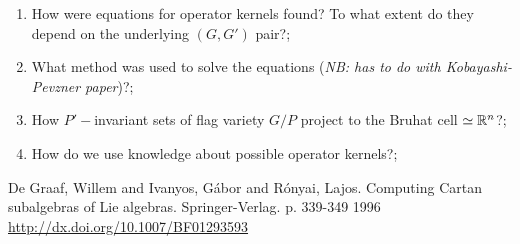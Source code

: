 \documentclass[12pt]{article} %
\begin{document}
\begin{enumerate}
\item How were equations for operator kernels found? To what extent do they depend on the underlying $(G,G')$ pair?;
\item What method was used to solve the equations (\textit{NB: has to do with Kobayashi-Pevzner paper})?;
\item How $P'-$invariant sets of flag variety $G/P$ project to the Bruhat cell $\simeq\mathbb{R}^n$?;
\item How do we use knowledge about possible operator kernels?;
\end{enumerate}
\begin{thebibliography}{9}
De Graaf, Willem and Ivanyos, Gábor and Rónyai, Lajos. Computing Cartan subalgebras of Lie algebras. Springer-Verlag. p. 339-349 1996
\url{ http://dx.doi.org/10.1007/BF01293593}
\end{thebibliography}
\end{document}
